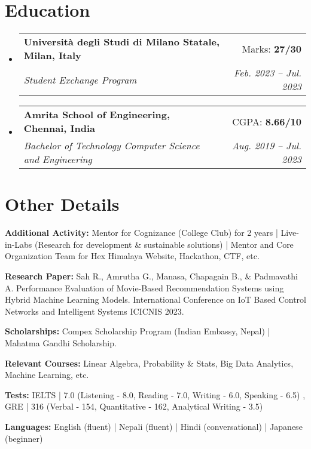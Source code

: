 \documentclass[a4paper,11pt]{article}
\makeatletter
\newcommand{\resumeSubheading}[4]{
  \vspace{-2pt}\item
    \begin{tabular*}{0.97\textwidth}[t]{l@{\extracolsep{\fill}}r}
      \textbf{#1} & #2 \\
      \textit{\small#3} & \textit{\small #4} \\
    \end{tabular*}\vspace{-7pt}
}
\newcommand{\resumeSubHeadingListStart}{\begin{itemize}[leftmargin=0.15in, label={}]}
\newcommand{\resumeSubHeadingListEnd}{\end{itemize}}
\makeatother
\begin{document}
\section{Education}
\resumeSubHeadingListStart
\resumeSubheading
{Università degli Studi di Milano Statale, Milan, Italy}{Marks: \textbf{27/30} }
{Student Exchange Program}{Feb. 2023 -- Jul. 2023}
\resumeSubheading
{Amrita School of Engineering, Chennai, India}{CGPA: \textbf{8.66/10}}
{Bachelor of Technology Computer Science and Engineering}{Aug. 2019 -- Jul. 2023}
\resumeSubHeadingListEnd

\section{Other Details}
\begin{itemize}[leftmargin=0.15in, label={}]
	\setlength\itemsep{-2pt}
	\small{\item{
		\textbf{Additional Activity:}{ Mentor for Cognizance (College Club) for 2 years | Live-in-Labs (Research for development \& sustainable solutions) | Mentor and Core Organization Team for Hex Himalaya Website, Hackathon, CTF, etc.} \\
		}
		\item{
		      \textbf{Research Paper:}{ Sah R., Amrutha G., Manasa, Chapagain B., \& Padmavathi A. Performance Evaluation of Movie-Based Recommendation Systems using Hybrid Machine Learning Models. International Conference on IoT Based Control Networks and Intelligent Systems ICICNIS 2023.
		      	} \\
		}
		\item{
		      \textbf{Scholarships:}{ Compex Scholarship Program (Indian Embassy, Nepal) | Mahatma Gandhi Scholarship.} \\
		}
		\item{
		      \textbf{Relevant Courses:}{ Linear Algebra, Probability \& Stats, Big Data Analytics, Machine Learning, etc.} \\
		}
  		\item{
		      \textbf{Tests:}{ IELTS | 7.0 (Listening - 8.0, Reading - 7.0, Writing - 6.0, Speaking - 6.5) , GRE | 316 (Verbal - 154, Quantitative - 162, Analytical Writing - 3.5)} \\
		}
		\item{
		      \textbf{Languages:}{ English (fluent) | Nepali (fluent) | Hindi (conversational) | Japanese (beginner)}
	}}
\end{itemize}

\end{document}
